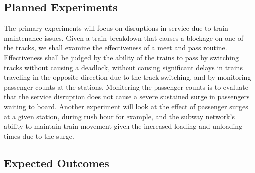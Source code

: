 \subsection{Planned Experiments}
The primary experiments will focus on disruptions in service due to train maintenance issues.  Given a train breakdown that causes a blockage on one of the tracks, we shall examine the effectiveness of a meet and pass routine.  Effectiveness shall be judged by the ability of the trains to pass by switching tracks without causing a deadlock, without causing significant delays in trains traveling in the opposite direction due to the track switching, and by monitoring passenger counts at the stations.  Monitoring the passenger counts is to evaluate that the service disruption does not cause a severe sustained surge in passengers waiting to board.  Another experiment will look at the effect of passenger surges at a given station, during rush hour for example, and the subway network's ability to maintain train movement given the increased loading and unloading times due to the surge.

\subsection{Expected Outcomes}

